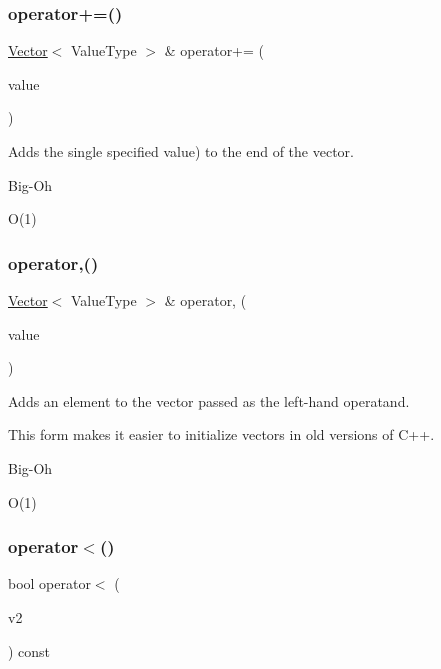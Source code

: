 \subsubsection{\texorpdfstring{operator+=()}{operator+=()}\hspace{0.1cm}{\footnotesize\ttfamily [3/3]}}
{\footnotesize\ttfamily \mbox{\hyperlink{classVector}{Vector}}$<$ Value\+Type $>$ \& operator+= (\begin{DoxyParamCaption}\item[{const Value\+Type \&}]{value }\end{DoxyParamCaption})}



Adds the single specified value) to the end of the vector. 

\begin{DoxyRefDesc}{Big-\/\+Oh}
\item[\mbox{\hyperlink{BigOh__BigOh000145}{Big-\/\+Oh}}]O(1) \end{DoxyRefDesc}
\mbox{\label{classVector_ad2a2f86bb5857209608bbbfe1066c650}} 
\subsubsection{\texorpdfstring{operator,()}{operator,()}}
{\footnotesize\ttfamily \mbox{\hyperlink{classVector}{Vector}}$<$ Value\+Type $>$ \& operator, (\begin{DoxyParamCaption}\item[{const Value\+Type \&}]{value }\end{DoxyParamCaption})}



Adds an element to the vector passed as the left-\/hand operatand. 

This form makes it easier to initialize vectors in old versions of C++. \begin{DoxyRefDesc}{Big-\/\+Oh}
\item[\mbox{\hyperlink{BigOh__BigOh000154}{Big-\/\+Oh}}]O(1) \end{DoxyRefDesc}
\mbox{\label{classVector_a77901fd042b59d646be1da79b8339c5c}} 
\subsubsection{\texorpdfstring{operator$<$()}{operator<()}}
{\footnotesize\ttfamily bool operator$<$ (\begin{DoxyParamCaption}\item[{const \mbox{\hyperlink{classVector}{Vector}}$<$ Value\+Type $>$ \&}]{v2 }\end{DoxyParamCaption}) const}



